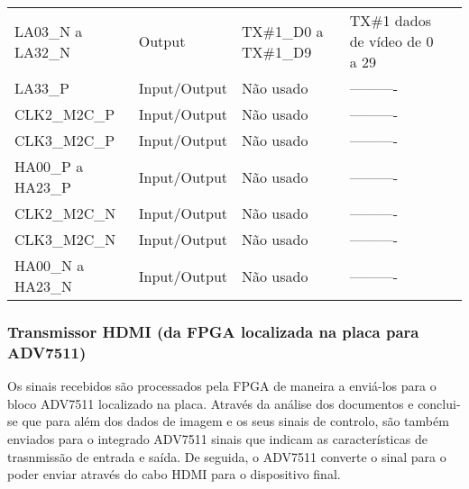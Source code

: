 \begin{table}[h!]
{\begin{tabular}{@{}lllll@{}}
			LA03\_N a LA32\_N    & Output                & TX\#1\_D0 a TX\#1\_D9  & TX\#1 dados de vídeo de 0 a 29 \\ 
			LA33\_P              & Input/Output          & Não usado              & ----------                     \\ 
			CLK2\_M2C\_P         & Input/Output          & Não usado              & ----------                     \\ 
			CLK3\_M2C\_P         & Input/Output          & Não usado              & ----------                     \\ 
			HA00\_P a HA23\_P    & Input/Output          & Não usado              & ----------                     \\ 
			CLK2\_M2C\_N         & Input/Output          & Não usado              & ----------                     \\ 
			CLK3\_M2C\_N         & Input/Output          & Não usado              & ----------                     \\ 
			HA00\_N a HA23\_N    & Input/Output          & Não usado              & ----------                     \\ \bottomrule
		\end{tabular}}
	\end{table}
	
\subsubsection{Transmissor HDMI (da FPGA localizada na placa para ADV7511)}

Os sinais recebidos são processados pela FPGA de maneira a enviá-los para o bloco ADV7511 localizado na placa. Através da análise dos documentos \cite{R017} e \cite{R018} conclui-se que para além dos dados de imagem e os seus sinais de controlo, são também enviados para o integrado ADV7511 sinais que indicam as características de trasnmissão de entrada e saída. De seguida, o ADV7511 converte o sinal para o poder enviar através do cabo HDMI para o dispositivo final. 



